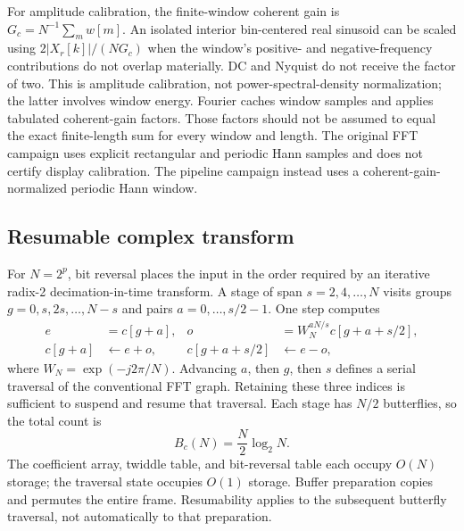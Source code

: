 \documentclass[11pt,letterpaper]{article}
\begin{document}
For amplitude calibration, the finite-window coherent gain is
$G_c=N^{-1}\sum_m w[m]$. An isolated interior bin-centered real sinusoid can be
scaled using $2|X_r[k]|/(NG_c)$ when the window's positive- and negative-frequency
contributions do not overlap materially. DC and Nyquist do not receive the
factor of two. This is amplitude calibration, not power-spectral-density
normalization; the latter involves window energy. Fourier caches window
samples and applies tabulated coherent-gain factors. Those factors should not
be assumed to equal the exact finite-length sum for every window and length.
The original FFT campaign uses explicit rectangular and periodic Hann samples
and does not certify display calibration. The pipeline campaign instead uses
a coherent-gain-normalized periodic Hann window.

\subsection{Resumable complex transform}
For $N=2^p$, bit reversal places the input in the order required by an iterative
radix-2 decimation-in-time transform. A stage of span $s=2,4,\ldots,N$ visits
groups $g=0,s,2s,\ldots,N-s$ and pairs $a=0,\ldots,s/2-1$. One step computes
\begin{align}
 e&=c[g+a], & o&=W_N^{aN/s}c[g+a+s/2],\\
 c[g+a]&\leftarrow e+o, & c[g+a+s/2]&\leftarrow e-o,
 \label{eq:butterfly}
\end{align}
where $W_N=\exp(-j2\pi/N)$. Advancing $a$, then $g$, then $s$ defines a serial
traversal of the conventional FFT graph. Retaining these three indices is
sufficient to suspend and resume that traversal. Each stage has $N/2$
butterflies, so the total count is
\begin{equation}
 B_c(N)=\frac{N}{2}\log_2 N.
 \label{eq:countcomplex}
\end{equation}
The coefficient array, twiddle table, and bit-reversal table each occupy
$O(N)$ storage; the traversal state occupies $O(1)$ storage. Buffer preparation
copies and permutes the entire frame. Resumability applies to the subsequent
butterfly traversal, not automatically to that preparation.
\end{document}
